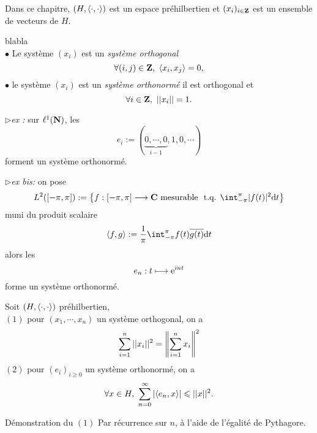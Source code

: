 \documentclass[a4paper,11pt, twoside]{article}
\begin{document}


Dans ce chapitre, $(H,\left\langle \cdot,\cdot \right\rangle)$ est un espace préhilbertien et $(x_i)_{i\in\mathbf Z}$ est un ensemble de vecteurs de $H$.



\begin{Def}{\color{white} blabla}\\
  $\bullet$ Le système $(x_i)$ est un \emph{système orthogonal} \ssi 
  $$\forall (i,j)\in\mathbf Z,\ \left\langle x_i,x_j \right\rangle=0,$$
  $\bullet$ le système $(x_i)$ est un \emph{système orthonormé} \ssi il est orthogonal et 
  $$\forall i\in\mathbf Z,\ ||x_i||=1.$$
\end{Def}


$\triangleright$\emph{ex : }sur $\ell^1(\mathbf N)$, les 
$$e_i:=(\underbrace{0,\cdots,0}_{i-1},1,0,\cdots)$$
forment un système orthonormé.


$\triangleright$\emph{ex bis: }on pose 
$$L^2([-\pi,\pi]):=\ens{f:[-\pi,\pi]\longrightarrow\C\text{ mesurable }\tq\dstyle\int_{-\pi}^\pi |f(t)|^2\dt}$$
muni du produit scalaire 
$$\ps{f,g}:=\frac{1}{\pi}\int_{-\pi}^\pi f(t)\overline{g(t)}\dt$$
alors les 
$$e_n:t\longmapsto \mathrm{e}^{int}$$
forme un système orthonormé.



\begin{prop}
  Soit $(H,\left\langle \cdot,\cdot \right\rangle)$ préhilbertien,\\
  $(\mathit 1)$ pour $(x_1,\cdots,x_n)$ un système orthogonal, on a 
  $$\sum_{i=1}^n||x_i||^2=\left\lVert\sum_{i=1}^n x_i\right\rVert^2$$
  $(\mathit 2)$ pour $(e_i)_{i\geqslant 0}$ un système orthonormé, on a 
  $$\forall x\in H,\ \sum_{n=0}^\infty\left| \left\langle e_n,x \right\rangle\right|\leqslant ||x||^2.$$
\end{prop}


\begin{ProofC}{Démonstration du $(\mathit 1)$}
  Par récurrence sur $n$, à l'aide de l'égalité de Pythagore.
\end{ProofC}
\end{document}
